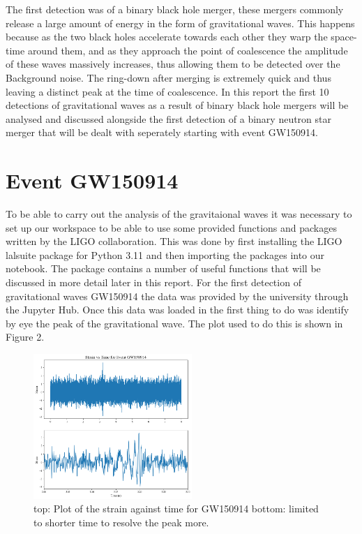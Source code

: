 \documentclass{article}
\begin{document}
The first detection was of a binary black hole merger, these mergers commonly
release a large amount of energy in the form of gravitational waves. This happens
because as the two black holes accelerate towards each other they warp the
space-time around them, and as they approach the point of coalescence the amplitude
of these waves massively increases, thus allowing them to be detected over the Background
noise. The ring-down after merging is extremely quick and thus leaving a distinct peak
at the time of coalescence. In this report the first 10 detections of gravitational waves
as a result of binary black hole mergers will be analysed and discussed alongside the first detection
of a binary neutron star merger that will be dealt with seperately starting with event GW150914.

\section*{Event GW150914}
To be able to carry out the analysis of the gravitaional waves it was necessary to set
up our workspace to be able to use some provided functions and packages written by the
LIGO collaboration. This was done by first installing the LIGO lalsuite package for Python 3.11
and then importing the packages into our notebook. The package contains a number of useful
functions that will be discussed in more detail later in this report.
For the first detection of gravitational waves GW150914 the data was provided
by the university through the Jupyter Hub. Once this data was loaded in
the first thing to do was identify by eye the peak
of the gravitational wave. The plot used to do this is shown in Figure 2.
\begin{figure}
    \includegraphics[width=6cm]{images/Signal_gw150914.png}
    \caption{top: Plot of the strain against time for GW150914 bottom:
    limited to shorter time to resolve the peak more.}
    \label{fig:GW150914}
\end{figure}
\end{document}
